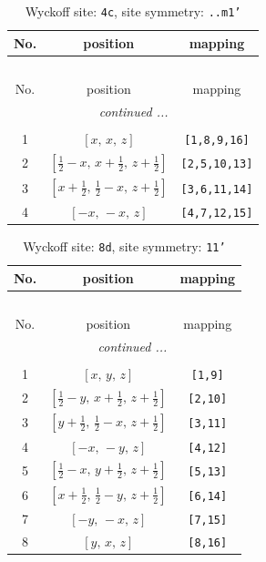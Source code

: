 \documentclass[fleqn,8pt]{jsarticle}
\begin{document}
\renewcommand{\arraystretch}{1.2}
\begin{longtable}{ccc}
\caption{Wyckoff site: {\tt 4c}, site symmetry: {\tt ..m1'}}
 \\
 \hline \hline
No. & position & mapping \\ \hline \endfirsthead

\multicolumn{2}{l}{\tablename\ \thetable{}} \\
 \hline \hline
No. & position & mapping \\ \hline \endhead

 \hline \hline
\multicolumn{2}{r}{\footnotesize\it continued ...} \\ \endfoot

 \hline \hline
\multicolumn{2}{r}{} \\ \endlastfoot

1 & $\left[ x,\, x,\, z \right]$ & {\tt [1,8,9,16]} \\ \hline
2 & $\left[ \frac{1}{2} - x,\, x + \frac{1}{2},\, z + \frac{1}{2} \right]$ & {\tt [2,5,10,13]} \\ \hline
3 & $\left[ x + \frac{1}{2},\, \frac{1}{2} - x,\, z + \frac{1}{2} \right]$ & {\tt [3,6,11,14]} \\ \hline
4 & $\left[ - x,\, - x,\, z \right]$ & {\tt [4,7,12,15]} \\
\end{longtable}
\renewcommand{\arraystretch}{1.2}
\begin{longtable}{ccc}
\caption{Wyckoff site: {\tt 8d}, site symmetry: {\tt 11'}}
 \\
 \hline \hline
No. & position & mapping \\ \hline \endfirsthead

\multicolumn{2}{l}{\tablename\ \thetable{}} \\
 \hline \hline
No. & position & mapping \\ \hline \endhead

 \hline \hline
\multicolumn{2}{r}{\footnotesize\it continued ...} \\ \endfoot

 \hline \hline
\multicolumn{2}{r}{} \\ \endlastfoot

1 & $\left[ x,\, y,\, z \right]$ & {\tt [1,9]} \\ \hline
2 & $\left[ \frac{1}{2} - y,\, x + \frac{1}{2},\, z + \frac{1}{2} \right]$ & {\tt [2,10]} \\ \hline
3 & $\left[ y + \frac{1}{2},\, \frac{1}{2} - x,\, z + \frac{1}{2} \right]$ & {\tt [3,11]} \\ \hline
4 & $\left[ - x,\, - y,\, z \right]$ & {\tt [4,12]} \\ \hline
5 & $\left[ \frac{1}{2} - x,\, y + \frac{1}{2},\, z + \frac{1}{2} \right]$ & {\tt [5,13]} \\ \hline
6 & $\left[ x + \frac{1}{2},\, \frac{1}{2} - y,\, z + \frac{1}{2} \right]$ & {\tt [6,14]} \\ \hline
7 & $\left[ - y,\, - x,\, z \right]$ & {\tt [7,15]} \\ \hline
8 & $\left[ y,\, x,\, z \right]$ & {\tt [8,16]} \\
\end{longtable}
\end{document}
